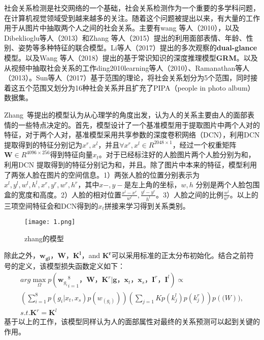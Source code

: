 社会关系检测是社交网络的一个基础\cite{li2015celebritynet}，社会关系检测作为一个重要的多学科问题，在计算机视觉领域受到越来越多的关注。随着这个问题被提出以来，有大量的工作用于从图片中抽取两个人之间的社会关系。主要有wang 等人（2010）\cite{wang2010seeing}，以及Dibeklioglu等人（2013）\cite{dibeklioglu2013like}和Zhang 等人（2015）\cite{zhang2015learning}提出的利用面部表情、年龄、性别、姿势等多种特征的联合模型。Li等人（2017）\cite{li2017dual-glance}提出的多次观察的\textbf{dual-glance}模型。以及Wang 等人（2018）\cite{wang2018deep}提出的基于常识知识的深度推理模型\textbf{GRM}。以及从视频中抽取社会关系的工作ding2010learning等人（2010）、Ramanathan等人 （2013）\cite{ramanathan2013social}。Sun等人（2017）\cite{sun2017a}基于范围的理论，将社会关系划分为5个范围，同时接着这五个范围又划分为16种社会关系并且扩充了PIPA（people in photo album）数据集\cite{zhang2015beyond}。

Zhang~等\cite{zhang2015learning}提出的模型认为从心理学的角度出发，认为人的关系主要由人的面部表情的一些特点决定的。首先，模型设计了一个基准模型用于提取图片中两个人对的特征，对于两个人对，基准模型采用共享参数的深度卷积网络（DCN），利用DCN提取得到的特征分别记为$x^r,x^l$，并且$\forall x^r,x^l \in R^{2048 \times 1}$，经过一个权重矩阵$\mathbf{W} \in R^{4096 \times 256}$得到特征向量$x_t$。对于已经标注好的人脸图片两个人脸分别为和，利用DCN 提取得到的特征分别记为和，并且。除了图片中本来的特征，模型利用了两张人脸在图片的空间信息。1）两张人脸的位置分别表示为${x^l,y^l,w^l,h^l,x^r,y^r,w^r,h^r}$，其中$x-,y-$是左上角的坐标，$w,h$ 分别是两个人脸包围盒的宽度和高度。2）人脸的相对位置$\frac{x^l-x^r}{w^l},\frac{y^l-y^r}{h^l}$。3）人脸之间的比例$\frac{w^l}{w^r}$。以上的三项空间特征会和DCN得到的$x_t$拼接来学习得到关系类别。
\begin{figure}[htpb]
	\centering
	\texttt{[image: 1.png]}
    \caption{zhang的模型}
	\vspace*{-3.5mm}
	\label{fig:model_zhang}
\end{figure}
除此之外，$\mathbf{w_{gi}}$，$\mathbf{W}$，$\mathbf{K^l}$，and $\mathbf{K^r}$可以采用标准的正太分布初始化。结合之前符号的定义，该模型损失函数定义如下：
\begin{equation}
\begin{split}
     arg\max \limits_{\Omega} p({\mathbf{w}_{g_i}}_{i=1}^8， \mathbf{W}，\mathbf{K}^r | \mathbf{g}，\mathbf{x}_t，\mathbf{x}_s，\mathbf{I}^r，\mathbf{I}^l) \propto \\
     (\sum_{i=1}^{8}p(g_i|x_t,x_s)p(w_(g_i)))(\sum_{j=1}{K}p(k_j^l)p(k_j^r))p(\mathbf(W)), \\
     s.t. \mathbf{K}^r = \mathbf{K}^l
\end{split}
\end{equation}
基于以上的工作，该模型同样认为人的面部属性对最终的关系预测可以起到关键的作用。

